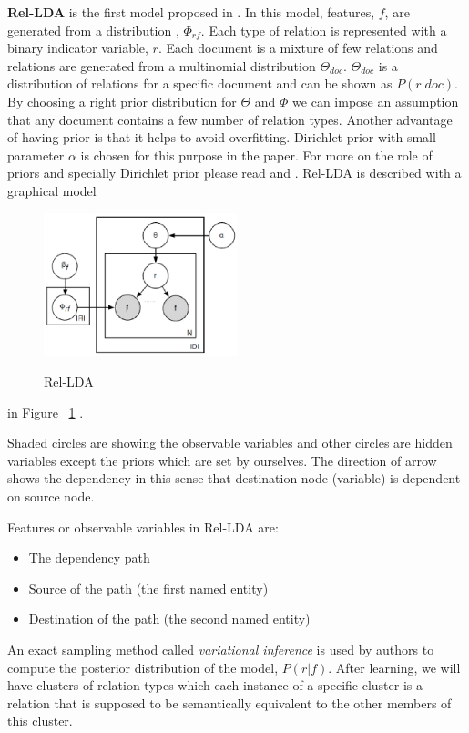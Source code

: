 \documentclass[12pt]{report}
\begin{document}
\textbf{Rel-LDA} is the first model proposed in \cite{Riedel2013}. 
In this model, features, $f$, are generated from a distribution , $\Phi_{rf}$. Each type
 of relation is represented with a binary indicator variable, $r$. Each document is a mixture of few relations
  and relations are generated from a multinomial distribution $\Theta_{doc}$. $\Theta_{doc}$ is a distribution
  of relations for a specific document and can be shown as $P(r|doc)$. By choosing a right prior distribution for $\Theta$
   and $\Phi$ we can impose an assumption that any document contains a few number of relation types. 
   Another advantage of having prior is that it helps to avoid overfitting. Dirichlet prior with small parameter $\alpha$ is 
   chosen for this purpose in the paper. For more on the role of priors and specially Dirichlet prior
    please read \cite{Teh2007} and \cite{Gershman2012} .
    Rel-LDA is described with a graphical model 
     \begin{figure}[h!]
  \caption{Rel-LDA}
  \centering
    \includegraphics[width=0.5\textwidth]{rel-lda.eps}
    \label{fig:rel-lda}
\end{figure} in Figure ~\ref{fig:rel-lda} .
     
    Shaded circles are showing the observable variables and other circles are hidden variables except 
    the priors which are set by ourselves. The direction of arrow shows the dependency in this sense 
    that destination node (variable) is dependent on source node.
      
    Features or observable variables in Rel-LDA are:
    \begin{itemize}
      \item The dependency path
      \item Source of the path (the first named entity)
      \item Destination of the path (the second named entity)
    \end{itemize}
   	
   	An exact sampling method called \emph{variational inference} is used by authors to compute 
   	the posterior distribution of the model, $P(r|f)$.
   	After learning, we will have clusters of relation types which each instance of a specific cluster 
   	is a relation that is supposed to be semantically equivalent to the other members of this cluster.
   	\\
   	
\end{document}
